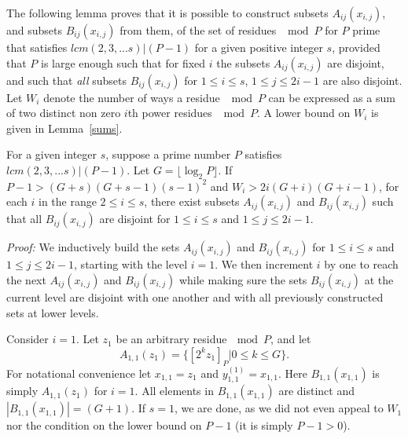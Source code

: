 The following lemma proves that it is possible to construct
subsets $A_{ij}(x_{i,j})$, and subsets $B_{ij}(x_{i,j})$ from
them, of the set of residues $\mod P$ for $P$ prime that satisfies
$lcm(2,3,...s) | (P-1)$ for a given positive integer $s$, provided
that $P$ is large enough such that for fixed $i$ the subsets
$A_{ij}(x_{i,j})$ are disjoint, and such that \emph{all} subsets
$B_{ij}(x_{i,j})$ for $1 \leq i \leq s$, $1 \leq j \leq 2i-1$ are
also disjoint. Let $W_i$ denote the number of ways a residue $\mod
P$ can be expressed as a sum of two distinct non zero $i$th power
residues $\mod P$. A lower bound on $W_i$ is given in
Lemma~\ref{sums}.
\begin{lemma}\label{lemmaw} For a given integer $s$, suppose a prime number $P$ satisfies $lcm(2,3,...s) |
(P-1)$. Let $G =\lfloor \log_2{P}\rfloor$. If $P-1 >
(G+s)(G+s-1)(s-1)^2$ and $W_i
> 2i(G+i)(G+i-1)$, for each $i$ in the range $2 \leq i \leq
s$, there exist subsets $A_{ij}(x_{i,j})$ and $B_{ij}(x_{i,j})$
 such that all $B_{ij}(x_{i,j})$ are disjoint for $1 \leq i \leq
s$ and $1 \leq j \leq 2i-1$.
\end{lemma}
\noindent \textit{Proof:} We inductively build the sets
$A_{ij}(x_{i,j})$ and $B_{ij}(x_{i,j})$ for $1 \leq i \leq s$ and
$1 \leq j \leq 2i-1$, starting with the level $i=1$. We then
increment $i$ by one to reach the next $A_{ij}(x_{i,j})$ and
$B_{ij}(x_{i,j})$ while making sure the sets $B_{ij}(x_{i,j})$ at
the current level are disjoint with one another and with all
previously constructed sets at lower levels.

Consider $i=1$. Let $z_1$ be an arbitrary residue$~\mod P$, and
let \[A_{1,1}(z_1)=\{[2^{k}z_1]_P | 0 \leq k \leq G \}.\] For
notational convenience let $x_{1,1}=z_1$ and
$y_{1,1}^{(1)}=x_{1,1}$. Here $B_{1,1}(x_{1,1})$ is simply
$A_{1,1}(z_1)$ for $i=1$. All elements in $B_{1,1}(x_{1,1})$ are
distinct and $|B_{1,1}(x_{1,1})| =(G+1)$. If $s=1$, we are done,
as we did not even appeal to $W_1$ nor the condition on the lower
bound on $P-1$ (it is simply $P-1>0$).

